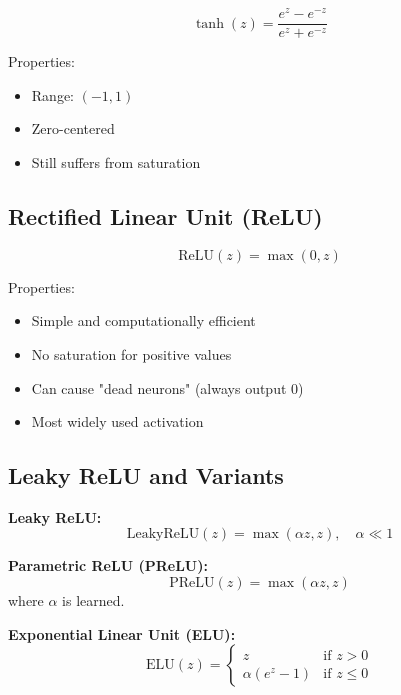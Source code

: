 \begin{equation}
\tanh(z) = \frac{e^z - e^{-z}}{e^z + e^{-z}}
\end{equation}

Properties:
\begin{itemize}
    \item Range: $(-1, 1)$
    \item Zero-centered
    \item Still suffers from saturation
\end{itemize}

\subsection{Rectified Linear Unit (ReLU)}

\begin{equation}
\text{ReLU}(z) = \max(0, z)
\end{equation}

Properties:
\begin{itemize}
    \item Simple and computationally efficient
    \item No saturation for positive values
    \item Can cause "dead neurons" (always output 0)
    \item Most widely used activation
\end{itemize}

\subsection{Leaky ReLU and Variants}

\textbf{Leaky ReLU:}
\begin{equation}
\text{LeakyReLU}(z) = \max(\alpha z, z), \quad \alpha \ll 1
\end{equation}

\textbf{Parametric ReLU (PReLU):}
\begin{equation}
\text{PReLU}(z) = \max(\alpha z, z)
\end{equation}
where $\alpha$ is learned.

\textbf{Exponential Linear Unit (ELU):}
\begin{equation}
\text{ELU}(z) = \begin{cases}
z & \text{if } z > 0 \\
\alpha(e^z - 1) & \text{if } z \leq 0
\end{cases}
\end{equation}

